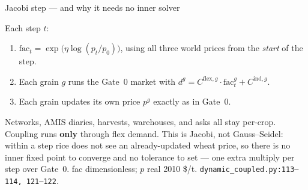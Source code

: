 \begin{frame}{Jacobi step --- and why it needs no inner solver}

Each step $t$:

\begin{enumerate}
\item $\mathrm{fac}_t = \exp\bigl(\eta \log(p_t/p_0)\bigr)$, using all
      three world prices from the \emph{start} of the step.
\item Each grain $g$ runs the Gate~0 market with
      $d^g = C^{\mathrm{flex},g}\cdot\mathrm{fac}^g_t + C^{\mathrm{ind},g}$.
\item Each grain updates its own price $p^g$ exactly as in Gate~0.
\end{enumerate}

Networks, AMIS diaries, harvests, warehouses, and asks all stay per-crop.
Coupling runs \textbf{only} through flex demand. This is Jacobi, not
Gauss--Seidel: within a step rice does not see an already-updated wheat
price, so there is no inner fixed point to converge and no tolerance to
set --- one extra multiply per step over Gate~0.
{fac dimensionless; $p$ real 2010 \$/t.}
{\texttt{dynamic\_coupled.py:113--114, 121--122}.}
\end{frame}


